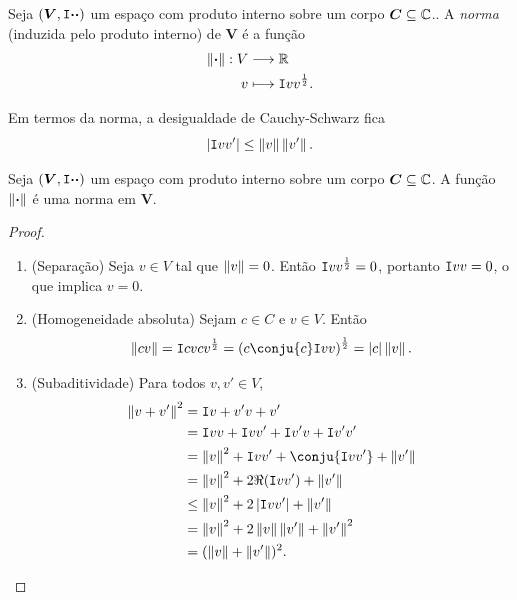 \begin{defi}
Seja $(\bm V,\mathtt I{\bm{\cdot}}{\bm{\cdot}})$ um espaço com produto interno sobre um corpo $\bm C \subseteq \mathbb{C}$.. A \emph{norma} (induzida pelo produto interno) de $\bm V$ é a função
	\begin{align*}
	{\left\Vert{\bm{\cdot}}\right\Vert}: {V} &\longrightarrow {\mathbb{R}} \\{v} &\longmapsto {\mathtt I{v}{v}^{\frac{1}{2}}}.
	\end{align*}
\end{defi}

Em termos da norma, a desigualdade de Cauchy-Schwarz fica
	\begin{equation*}
	\left\vert{\mathtt I{v}{v'}}\right\vert \leq \left\Vert{v}\right\Vert\left\Vert{v'}\right\Vert.
	\end{equation*}

\begin{prop}
Seja $(\bm V,\mathtt I{\bm{\cdot}}{\bm{\cdot}})$ um espaço com produto interno sobre um corpo $\bm C \subseteq \mathbb{C}$. A função $\left\Vert{\bm{\cdot}}\right\Vert$ é uma norma em $\bm V$.
\end{prop}
\begin{proof}
	\begin{enumerate}
	\item (Separação) Seja $v \in V$ tal que $\left\Vert{v}\right\Vert=0$. Então $\mathtt I{v}{v}^\frac{1}{2}=0$, portanto $\mathtt I{v}{v}=0$, o que implica $v=0$.

	\item (Homogeneidade absoluta) Sejam $c \in C$ e $v \in V$. Então
	\begin{equation*}
	\nor{cv} = \inte{cv}{cv}^{\frac{1}{2}} = \left(c\conju{c}\inte{v}{v}\right)^{\frac{1}{2}} = \abs{c}\nor{v}.
	\end{equation*}
	
	\item (Subaditividade) Para todos $v,v' \in V$,
	\begin{align*}
	\nor{v+v'}^2 &= \inte{v+v'}{v+v'} \\
		&= \inte{v}{v}+\inte{v}{v'}+\inte{v'}{v}+\inte{v'}{v'} \\
		&=  \nor{v}^2+\inte{v}{v'}+\conju{\inte{v}{v'}}+\nor{v'}\\
		&= \nor{v}^2+2\Re(\inte{v}{v'})+\nor{v'}\\
		&\leq \nor{v}^2+2\abs{\inte{v}{v'}}+\nor{v'}\\
		&= \nor{v}^2 + 2\nor{v}\nor{v'}+\nor{v'}^2 \\
		&= (\nor{v} + \nor{v'})^2. \qedhere
	\end{align*}
	\end{enumerate}
\end{proof}

